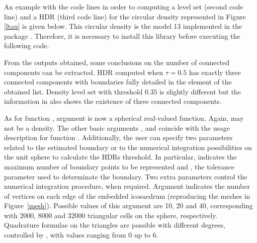 An example with the code lines in order to computing a level set  (second code line) and a HDR (third code line) for the circular density represented in Figure \ref{ltau} is given below. This circular density is the model 13 implemented in the package . Therefore, it is necessary to install this library before executing the following code. 
From the outputs obtained, some conclusions on the number of connected components can be extracted. HDR computed when $$ has exactly three connected components with boundaries fully detailed in the element  of the obtained list. Density level set with threshold $0.35$ is slightly different but the information in  also shows the existence of three connected components.
 
As for function , argument  is now a spherical real-valued function. Again,  may not be a density. The other basic arguments ,  and  coincide with the usage description for function . Additionally, the user can specify two parameters related to the estimated boundary or to the numerical integration possibilities on the unit sphere to calculate the HDRs threshold. In particular,  indicates the maximum number of boundary points to be represented and , the tolerance parameter used to determinate the boundary. Two extra parameters control the numerical integration procedure, when required. Argument  indicates the number of vertices on each edge of the embedded icosaedrum (reproducing the meshes in Figure~\ref{mesh}). Possible values of this argument are 10, 20 and 40, corresponding with 2000, 8000 and 32000 triangular cells on the sphere, respectively. Quadrature formulae on the triangles are possible with different degrees, controlled by , with values ranging from 0 up to 6.

